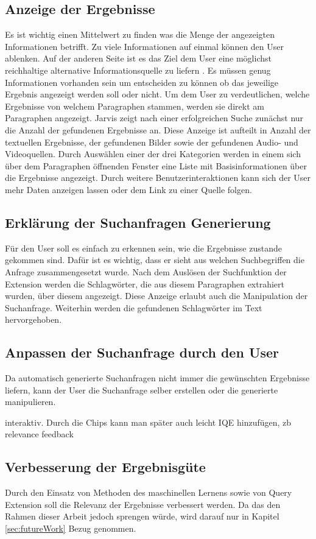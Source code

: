  \subsection{Anzeige der Ergebnisse}
 Es ist wichtig einen Mittelwert zu finden was die Menge der angezeigten Informationen betrifft. Zu viele Informationen auf einmal können den User ablenken. Auf der anderen Seite ist es das Ziel dem User eine möglichst reichhaltige alternative Informationsquelle zu liefern \cite{rhodes2000margin}. Es müssen genug Informationen vorhanden sein um entscheiden zu können ob das jeweilige Ergebnis angezeigt werden soll oder nicht. Um dem User zu verdeutlichen, welche Ergebnisse von welchem Paragraphen stammen, werden sie direkt am Paragraphen angezeigt. Jarvis zeigt nach einer erfolgreichen Suche zunächst nur die Anzahl der gefundenen Ergebnisse an. Diese Anzeige ist aufteilt in Anzahl der textuellen Ergebnisse, der gefundenen Bilder sowie der gefundenen Audio- und Videoquellen. Durch Auswählen einer der drei Kategorien werden in einem sich über dem Paragraphen öffnenden Fenster eine Liste mit Basisinformationen über die Ergebnisse angezeigt. Durch weitere Benutzerinteraktionen kann sich der User mehr Daten anzeigen lassen oder dem Link zu einer Quelle folgen.

 \subsection{Erklärung der Suchanfragen Generierung}
 Für den User soll es einfach zu erkennen sein, wie die Ergebnisse zustande gekommen sind. Dafür ist es wichtig, dass er sieht aus welchen Suchbegriffen die Anfrage zusammengesetzt wurde. Nach dem Auslösen der Suchfunktion der Extension werden die Schlagwörter, die aus diesem Paragraphen extrahiert wurden, über diesem angezeigt. Diese Anzeige erlaubt auch die Manipulation der Suchanfrage. Weiterhin werden die gefundenen Schlagwörter im Text hervorgehoben.

 \subsection{Anpassen der Suchanfrage durch den User}
 Da automatisch generierte Suchanfragen nicht immer die gewünschten Ergebnisse liefern, kann der User die Suchanfrage selber erstellen oder die generierte manipulieren. 

 interaktiv.
 Durch die Chips kann man später auch leicht IQE hinzufügen, zb relevance feedback

 \subsection{Verbesserung der Ergebnisgüte}
 Durch den Einsatz von Methoden des maschinellen Lernens sowie von Query Extension soll die Relevanz der Ergebnisse verbessert werden. Da das den Rahmen dieser Arbeit jedoch sprengen würde, wird darauf nur in Kapitel \ref{sec:futureWork} Bezug genommen.